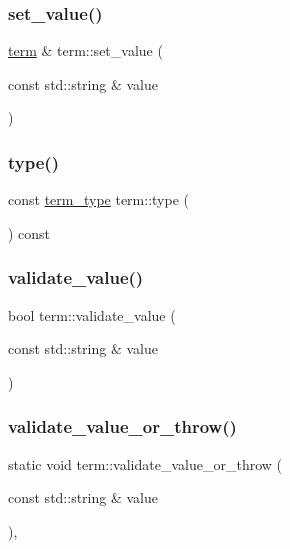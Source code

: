 \mbox{\label{classterm_acca1461208dd0dbb4a99f863e00fbcf0}} 
\subsubsection{\texorpdfstring{set\_value()}{set\_value()}}
{\footnotesize\ttfamily \mbox{\hyperlink{classterm}{term}} \& term\+::set\+\_\+value (\begin{DoxyParamCaption}\item[{const std\+::string \&}]{value }\end{DoxyParamCaption})}

\mbox{\label{classterm_acf03b98d53a1857e7bb58a229bc09f53}} 
\subsubsection{\texorpdfstring{type()}{type()}}
{\footnotesize\ttfamily const \mbox{\hyperlink{term_8h_a01c5d13b4b82a95ffc3de77e52c7603b}{term\+\_\+type}} term\+::type (\begin{DoxyParamCaption}{ }\end{DoxyParamCaption}) const}

\mbox{\label{classterm_aae7f7ded20c2c4ceaca14300f90bef2c}} 
\subsubsection{\texorpdfstring{validate\_value()}{validate\_value()}}
{\footnotesize\ttfamily bool term\+::validate\+\_\+value (\begin{DoxyParamCaption}\item[{const std\+::string \&}]{value }\end{DoxyParamCaption})\hspace{0.3cm}{\ttfamily [static]}}

\mbox{\label{classterm_a8fffcf0ea764c871292f5a301e734b03}} 
\subsubsection{\texorpdfstring{validate\_value\_or\_throw()}{validate\_value\_or\_throw()}}
{\footnotesize\ttfamily static void term\+::validate\+\_\+value\+\_\+or\+\_\+throw (\begin{DoxyParamCaption}\item[{const std\+::string \&}]{value }\end{DoxyParamCaption})\hspace{0.3cm}{\ttfamily [inline]}, {\ttfamily [static]}}

